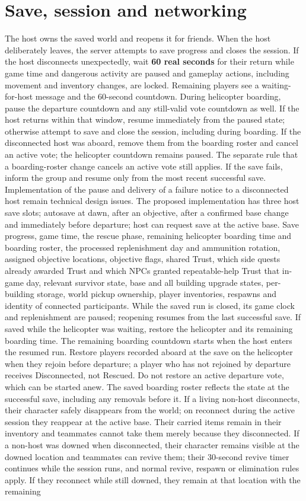\section{Save, session and networking}
The host owns the saved world and reopens it for friends. When the host deliberately leaves, the server attempts to save progress and closes the session. If the host disconnects unexpectedly, wait \textbf{60 real seconds} for their return while game time and dangerous activity are paused and gameplay actions, including movement and inventory changes, are locked. Remaining players see a waiting-for-host message and the 60-second countdown. During helicopter boarding, pause the departure countdown and any still-valid vote countdown as well. If the host returns within that window, resume immediately from the paused state; otherwise attempt to save and close the session, including during boarding. If the disconnected host was aboard, remove them from the boarding roster and cancel an active vote; the helicopter countdown remains paused. The separate rule that a boarding-roster change cancels an active vote still applies. If the save fails, inform the group and resume only from the most recent successful save. Implementation of the pause and delivery of a failure notice to a disconnected host remain technical design issues. The proposed implementation has three host save slots; autosave at dawn, after an objective, after a confirmed base change and immediately before departure; host can request save at the active base. Save progress, game time, the rescue phase, remaining helicopter boarding time and boarding roster, the processed replenishment day and ammunition rotation, assigned objective locations, objective flags, shared Trust, which side quests already awarded Trust and which NPCs granted repeatable-help Trust that in-game day, relevant survivor state, base and all building upgrade states, per-building storage, world pickup ownership, player inventories, respawns and identity of connected participants. While the saved run is closed, its game clock and replenishment are paused; reopening resumes from the last successful save. If saved while the helicopter was waiting, restore the helicopter and its remaining boarding time. The remaining boarding countdown starts when the host enters the resumed run. Restore players recorded aboard at the save on the helicopter when they rejoin before departure; a player who has not rejoined by departure receives Disconnected, not Rescued. Do not restore an active departure vote, which can be started anew. The saved boarding roster reflects the state at the successful save, including any removals before it. If a living non-host disconnects, their character safely disappears from the world; on reconnect during the active session they reappear at the active base. Their carried items remain in their inventory and teammates cannot take them merely because they disconnected. If a non-host was downed when disconnected, their character remains visible at the downed location and teammates can revive them; their 30-second revive timer continues while the session runs, and normal revive, respawn or elimination rules apply. If they reconnect while still downed, they remain at that location with the remaining 